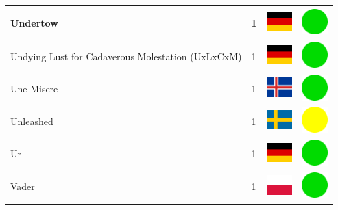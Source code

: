 \documentclass[12pt, a4paper, twoside]{report}
\begin{document}
\begin{center}
\begin{longtable}{|p{5cm}|p{2cm}|p{2cm}|p{2cm}|}
			Undertow & 1 & \includegraphics[width=1cm]{4x3/de} & \includegraphics[width=1cm]{likes/y} \\ \hline
			Undying Lust for Cadaverous Molestation (UxLxCxM) & 1 & \includegraphics[width=1cm]{4x3/de} & \includegraphics[width=1cm]{likes/y} \\ \hline
			Une Misere & 1 & \includegraphics[width=1cm]{4x3/is} & \includegraphics[width=1cm]{likes/y} \\ \hline
			Unleashed & 1 & \includegraphics[width=1cm]{4x3/se} & \includegraphics[width=1cm]{likes/m} \\ \hline
			Ur & 1 & \includegraphics[width=1cm]{4x3/de} & \includegraphics[width=1cm]{likes/y} \\ \hline
			Vader & 1 & \includegraphics[width=1cm]{4x3/pl} & \includegraphics[width=1cm]{likes/y} \\ \hline

\end{longtable}
\end{center}
\end{document}

